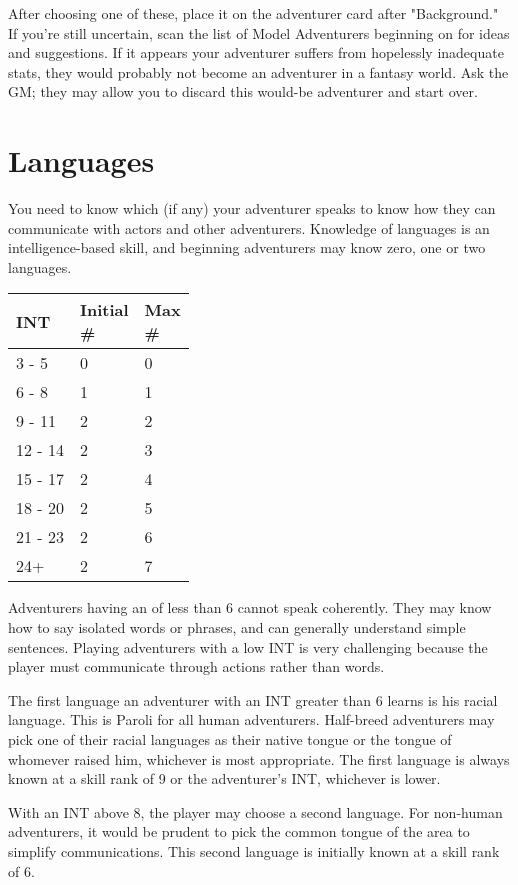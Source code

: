 \begin{multicols*}{2}
After choosing one of these, place it on the adventurer card after "Background." If you're still uncertain, scan the list of Model Adventurers beginning on \tcpage{\pageref{create-models}} for ideas and suggestions. If it appears your adventurer suffers from hopelessly inadequate stats, they would probably not become an adventurer in a fantasy world. Ask the GM; they may allow you to discard this would-be adventurer and start over.
\section{Languages}
You need to know which  (if any) your adventurer speaks to know how they can communicate with actors and other adventurers. Knowledge of languages is an intelligence-based skill, and beginning adventurers may know zero, one or two languages.
\label{create-language}
\begin{normbox}
\begin{tabular}{l l l}
\small
INT & \makecell{Initial\\\#} & \makecell{Max\\\#}\\
\midrule
3 - 5 & 0 & 0\\
6 - 8 & 1 & 1\\
9 - 11 & 2 & 2\\
12 - 14 & 2 & 3\\
15 - 17 & 2 & 4\\
18 - 20 & 2 & 5\\
21 - 23 & 2 & 6\\
24+ & 2 & 7\\
\end{tabular}
\end{normbox}

Adventurers having an \INT of less than 6 cannot speak coherently. They may know how to say isolated words or phrases, and can generally understand simple sentences. Playing adventurers with a low INT is very challenging because the player must communicate through actions rather than words.

The first language an adventurer with an INT greater than 6 learns is his racial language. This is Paroli for all human adventurers. Half-breed adventurers may pick one of their racial languages as their native tongue or the tongue of whomever raised him, whichever is most appropriate. The first language is always known at a skill rank of 9 or the adventurer's INT, whichever is lower.

With an INT above 8, the player may choose a second language. For non-human adventurers, it would be prudent to pick the common tongue of the area to simplify communications. This second language is initially known at a skill rank of 6.


\end{multicols*}
